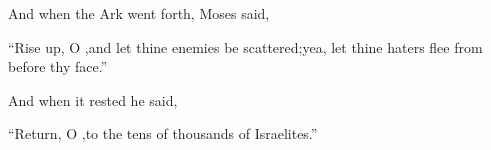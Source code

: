 \begin{inparaenum}
   And when the Ark went forth, Moses said,\smallskip%
  
  \pa ``Rise up, O \lord,\pa and let thine enemies be scattered;\pa yea, let thine haters flee from before thy face.''%
  
  \noindent{} And when it rested he said,\smallskip%
  
  \pa ``Return, O \lord,\pa to the tens of thousands of Israelites.''%
\end{inparaenum}
